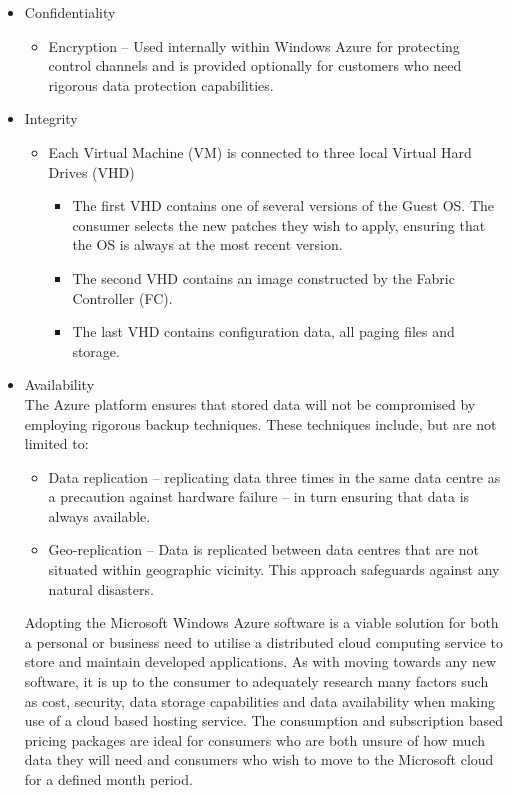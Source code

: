 \begin{itemize}
\item Confidentiality
\begin{itemize}
\item Encryption -- Used internally within Windows Azure for protecting control channels and is provided optionally for customers who need rigorous data protection capabilities. 
\end{itemize}
\item Integrity
\begin{itemize}
\item Each Virtual Machine (VM) is connected to three local Virtual Hard Drives (VHD)
\begin{itemize}
\item The first VHD contains one of several versions of the Guest OS. The consumer selects the new patches they wish to apply, ensuring that the OS is always at the most recent version.
\item The second VHD contains an image constructed by the Fabric Controller (FC).
\item The last VHD contains configuration data, all paging files and storage. 
\end{itemize}
\end{itemize}
\item Availability \\ The Azure platform ensures that stored data will not be compromised by employing rigorous backup techniques. These techniques include, but are not limited to\ftAfour:\ftAfourText
\begin{itemize}
\item Data replication -- replicating data three times in the same data centre as a precaution against hardware failure – in turn ensuring that data is always available.
\item Geo-replication -- Data is replicated between data centres that are not situated within geographic vicinity. This approach safeguards against any natural disasters.
\end{itemize}

Adopting the Microsoft Windows Azure software is a viable solution for both a personal or business need to utilise a distributed cloud computing service to store and maintain developed applications. As with moving towards any new software, it is up to the consumer to adequately research many factors such as cost, security, data storage capabilities and data availability when making use of a cloud based hosting service. The consumption and subscription based pricing packages are ideal for consumers who are both unsure of how much data they will need and consumers who wish to move to the Microsoft cloud for a defined month period.

\end{itemize}
